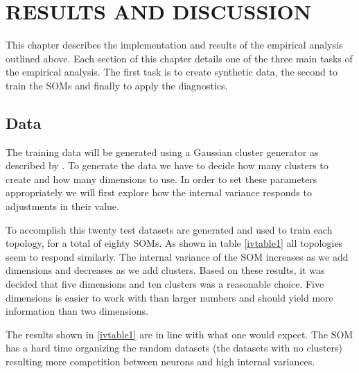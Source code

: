 \chapter{RESULTS AND DISCUSSION}
This chapter describes the implementation and results of the empirical analysis
outlined above.  Each section of this chapter details one of the three main
tasks of the empirical analysis.  The first task is to create synthetic data,
the second to train the SOMs and finally to apply the diagnostics.

\section{Data}
The training data will be generated using a Gaussian cluster generator as
described by \cite{handl}.  To generate the data we have to decide how many
clusters to create and how many dimensions to use.  In order to set these
parameters appropriately we will first explore how the internal variance
responds to adjustments in their value.

To accomplish this twenty test datasets are generated and used to train each
topology, for a total of eighty SOMs. As shown in table \ref{ivtable1} all topologies
seem to respond similarly. The internal variance of the SOM increases as we
add dimensions and decreases as we add clusters. Based on these results, it was
decided that five dimensions and ten clusters was a reasonable choice. Five
dimensions is easier to work with than larger numbers and should yield more
information than two dimensions.

The results shown in \ref{ivtable1} are in line with what one would expect.
The SOM has a hard time organizing the random datasets (the datasets with no
clusters) resulting more competition between neurons and high internal
variances.

